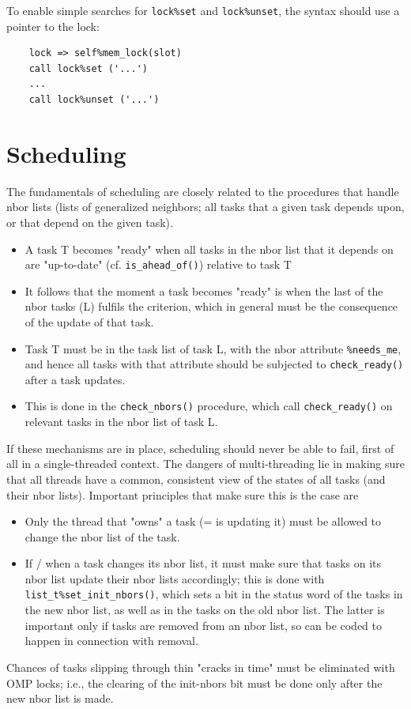 \documentclass[paper=a4,fontsize=11pt]{scrartcl}
\numberwithin{equation}{section}		%
\numberwithin{figure}{section}			%
\numberwithin{table}{section}				%
\newcommand{\codecolor}{\color{Blue}}
\newcommand{\Code}[1]{{\codecolor\texttt{#1}}}
\def\checkready{\Code{check\_ready()}}
\def\checknbors{\Code{check\_nbors()}}
\def\isaheadof{\Code{is\_ahead\_of()}}
\begin{document}
To enable simple searches for \Code{lock\%set} and \Code{lock\%unset}, the syntax should use a pointer to the lock:
{\codecolor
\begin{verbatim}
    lock => self%mem_lock(slot)
    call lock%set ('...')
    ...
    call lock%unset ('...')
\end{verbatim}}

\section{Scheduling}
The fundamentals of scheduling are closely related to the procedures that handle nbor lists (lists of generalized neighbors; all tasks that a given task depends upon, or that depend on the given task).
\begin{itemize}
    \item A task T becomes "ready" when all tasks in the nbor list that it depends on are "up-to-date" (cf. \isaheadof) relative to task T
    \item It follows that the moment a task becomes "ready" is when the last of the nbor tasks (L) fulfils the criterion, which in general must be the consequence of the update of that task.
    \item Task T must be in the task list of task L, with the nbor attribute \Code{\%needs\_me}, and hence all tasks with that attribute should be subjected to \checkready{} after a task updates.
    \item This is done in the \checknbors{} procedure, which call \checkready{} on relevant tasks in the nbor list of task L.
\end{itemize}
If these mechanisms are in place, scheduling should never be able to fail, first of all in a single-threaded context.  The dangers of multi-threading lie in making sure that all threads have a common, consistent view of the states of all tasks (and their nbor lists).  Important principles that make sure this is the case are
\def\setinitnbors{\Code{list\_t\%set\_init\_nbors()}}
\begin{itemize}
    \item[A)] Only the thread that "owns" a task (= is updating it) must be allowed to change the nbor list of the task.
    \item[B)] If / when a task changes its nbor list, it must make sure that tasks on its nbor list update their nbor lists accordingly; this is done with \setinitnbors, which sets a bit in the status word of the tasks in the new nbor list, as well as in the tasks on the old nbor list.  The latter is important only if tasks are removed from an nbor list, so can be coded to happen in connection with removal.
\end{itemize}
Chances of tasks slipping through thin "cracks in time" must be eliminated with OMP locks; i.e., the clearing of the init-nbors bit must be done only after the new nbor list is made.
\end{document}
